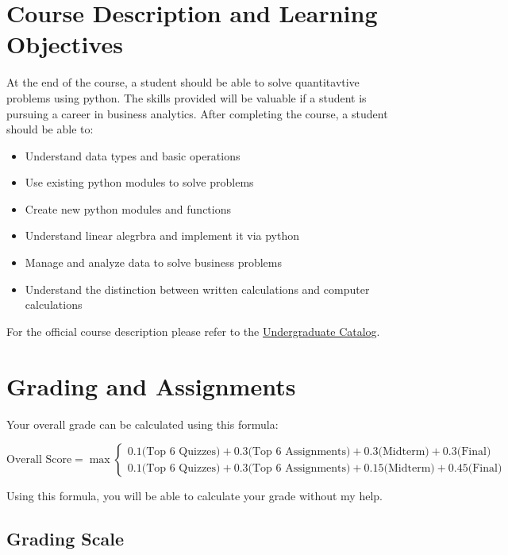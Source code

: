 \documentclass[11pt]{paper}
\begin{document}
\section{Course Description and Learning Objectives}

At the end of the course, a student should be able to solve quantitavtive problems using python. The skills provided will be valuable if a student is pursuing a career in business analytics. After completing the course, a student should be able to:

\begin{itemize}
\item Understand data types and basic operations
\item Use existing python modules to solve problems
\item Create new python modules and functions
\item Understand linear alegrbra and implement it via python
\item Manage and analyze data to solve business problems
\item Understand the distinction between written calculations and computer calculations 
\end{itemize}

For the official course description please refer to the \href{http://catalog.ucf.edu/search_advanced.php?catoid=14}{Undergraduate Catalog}.

\section{Grading and Assignments}

Your overall grade can be calculated using this formula:

  \begin{equation*}
    \text{Overall Score} = \max
    \begin{cases}
      0.1 \text{(Top 6 Quizzes)} + 0.3 \text{(Top 6 Assignments)} + 0.3 \text{(Midterm)} + 0.3 \text{(Final)} \\
      0.1 \text{(Top 6 Quizzes)} + 0.3 \text{(Top 6 Assignments)} + 0.15 \text{(Midterm)} + 0.45 \text{(Final)}
    \end{cases}
  \end{equation*}

Using this formula, you will be able to calculate your grade without my help.

\subsection{Grading Scale}
\end{document}

